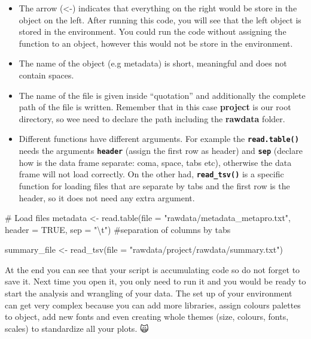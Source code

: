 \documentclass[
  letterpaper,
  DIV=11,
  numbers=noendperiod]{scrartcl}
\newenvironment{Shaded}{\begin{snugshade}}{\end{snugshade}}
\newcommand{\AttributeTok}[1]{\textcolor[rgb]{0.40,0.45,0.13}{#1}}
\newcommand{\CommentTok}[1]{\textcolor[rgb]{0.37,0.37,0.37}{#1}}
\newcommand{\ConstantTok}[1]{\textcolor[rgb]{0.56,0.35,0.01}{#1}}
\newcommand{\FunctionTok}[1]{\textcolor[rgb]{0.28,0.35,0.67}{#1}}
\newcommand{\NormalTok}[1]{\textcolor[rgb]{0.00,0.23,0.31}{#1}}
\newcommand{\OtherTok}[1]{\textcolor[rgb]{0.00,0.23,0.31}{#1}}
\newcommand{\SpecialCharTok}[1]{\textcolor[rgb]{0.37,0.37,0.37}{#1}}
\newcommand{\StringTok}[1]{\textcolor[rgb]{0.13,0.47,0.30}{#1}}
\begin{document}
\begin{itemize}
\item
  The arrow (\textless-) indicates that everything on the right would be
  store in the object on the left. After running this code, you will see
  that the left object is stored in the environment. You could run the
  code without assigning the function to an object, however this would
  not be store in the environment.
\item
  The name of the object (e.g metadata) is short, meaningful and does
  not contain spaces.
\item
  The name of the file is given inside ``quotation'' and additionally
  the complete path of the file is written. Remember that in this case
  \textbf{project} is our root directory, so wee need to declare the
  path including the \textbf{rawdata} folder.
\item
  Different functions have different arguments. For example the
  \textbf{\texttt{read.table()}} needs the arguments
  \textbf{\texttt{header}} (assign the first row as header) and
  \textbf{\texttt{sep}} (declare how is the data frame separate: coma,
  space, tabs etc), otherwise the data frame will not load correctly. On
  the other had, \textbf{\texttt{read\_tsv()}} is a specific function
  for loading files that are separate by tabs and the first row is the
  header, so it does not need any extra argument.
\end{itemize}

\begin{Shaded}
\begin{Highlighting}[]
\CommentTok{\# Load files}
\NormalTok{metadata }\OtherTok{\textless{}{-}} \FunctionTok{read.table}\NormalTok{(}\AttributeTok{file =} \StringTok{"rawdata/metadata\_metapro.txt"}\NormalTok{,}
                       \AttributeTok{header =} \ConstantTok{TRUE}\NormalTok{,}
                       \AttributeTok{sep =} \StringTok{"}\SpecialCharTok{\textbackslash{}t}\StringTok{"}\NormalTok{) }\CommentTok{\#separation of columns by tabs}

\NormalTok{summary\_file }\OtherTok{\textless{}{-}} \FunctionTok{read\_tsv}\NormalTok{(}\AttributeTok{file =} \StringTok{"rawdata/project/rawdata/summary.txt"}\NormalTok{)}
\end{Highlighting}
\end{Shaded}

At the end you can see that your script is accumulating code so do not
forget to save it. Next time you open it, you only need to run it and
you would be ready to start the analysis and wrangling of your data. The
set up of your environment can get very complex because you can add more
libraries, assign colours palettes to object, add new fonts and even
creating whole themes (size, colours, fonts, scales) to standardize all
your plots. 🙀
\end{document}
